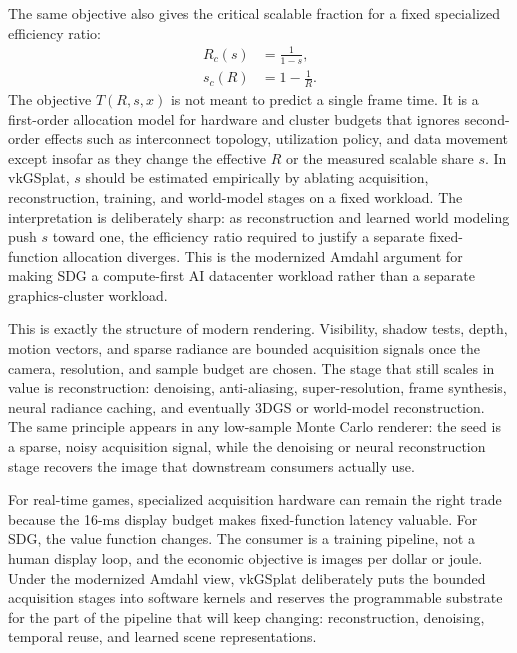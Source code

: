 \documentclass[10pt,journal,onecolumn]{IEEEtran}
\begin{document}
The same objective also gives the critical scalable fraction for a fixed
specialized efficiency ratio:
\begin{equation}
\boxed{
\begin{aligned}
  R_c(s) &= \frac{1}{1-s},\\
  s_c(R) &= 1-\frac{1}{R}.
\end{aligned}}
\label{eq:main-modern-amdahl}
\end{equation}
The objective $T(R,s,x)$ is not meant to predict a single frame time. It is a
first-order allocation model for hardware and cluster budgets that ignores
second-order effects such as
interconnect topology, utilization policy, and data movement except insofar as
they change the effective $R$ or the measured scalable share $s$. In vkGSplat,
$s$ should be estimated empirically by ablating acquisition, reconstruction,
training, and world-model stages on a fixed workload. The interpretation is
deliberately sharp: as reconstruction and learned world modeling push $s$ toward
one, the efficiency ratio required to justify a separate fixed-function
allocation diverges. This is the modernized Amdahl argument for making SDG a
compute-first AI datacenter workload rather than a separate graphics-cluster
workload.

This is exactly the structure of modern rendering.  Visibility, shadow
tests, depth, motion vectors, and sparse radiance are bounded acquisition
signals once the camera, resolution, and sample budget are chosen.  The
stage that still scales in value is reconstruction: denoising,
anti-aliasing, super-resolution, frame synthesis, neural radiance
caching, and eventually 3DGS or world-model reconstruction. The same
principle appears in any low-sample Monte Carlo renderer: the seed is a
sparse, noisy acquisition signal, while the denoising or neural
reconstruction stage recovers the image that downstream consumers
actually use.

For real-time games, specialized acquisition hardware can remain the
right trade because the 16-ms display budget makes fixed-function
latency valuable.  For SDG, the value function changes.  The consumer is
a training pipeline, not a human display loop, and the economic objective
is images per dollar or joule.  Under the modernized Amdahl view,
vkGSplat deliberately puts the bounded acquisition stages into software
kernels and reserves the programmable substrate for the part of the
pipeline that will keep changing: reconstruction, denoising, temporal
reuse, and learned scene representations.
\end{document}
